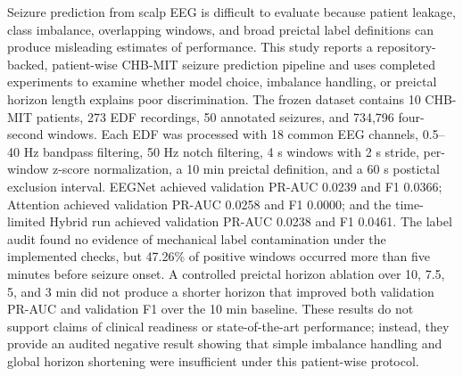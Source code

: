 Seizure prediction from scalp EEG is difficult to evaluate because patient leakage, class imbalance, overlapping windows, and broad preictal label definitions can produce misleading estimates of performance. This study reports a repository-backed, patient-wise CHB-MIT seizure prediction pipeline and uses completed experiments to examine whether model choice, imbalance handling, or preictal horizon length explains poor discrimination. The frozen dataset contains 10 CHB-MIT patients, 273 EDF recordings, 50 annotated seizures, and 734,796 four-second windows. Each EDF was processed with 18 common EEG channels, 0.5--40 Hz bandpass filtering, 50 Hz notch filtering, 4 s windows with 2 s stride, per-window z-score normalization, a 10 min preictal definition, and a 60 s postictal exclusion interval. EEGNet achieved validation PR-AUC 0.0239 and F1 0.0366; Attention achieved validation PR-AUC 0.0258 and F1 0.0000; and the time-limited Hybrid run achieved validation PR-AUC 0.0238 and F1 0.0461. The label audit found no evidence of mechanical label contamination under the implemented checks, but 47.26\% of positive windows occurred more than five minutes before seizure onset. A controlled preictal horizon ablation over 10, 7.5, 5, and 3 min did not produce a shorter horizon that improved both validation PR-AUC and validation F1 over the 10 min baseline. These results do not support claims of clinical readiness or state-of-the-art performance; instead, they provide an audited negative result showing that simple imbalance handling and global horizon shortening were insufficient under this patient-wise protocol.
